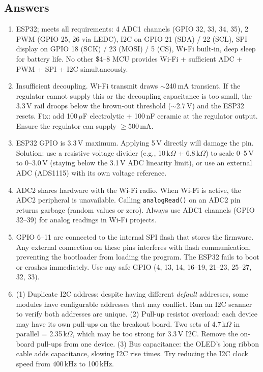 \documentclass[11pt,letterpaper,twoside,openany]{book}
\begin{document}
\subsection{Answers}
\begin{enumerate}[leftmargin=1.5em]
\item ESP32; meets all requirements: 4 ADC1 channels (GPIO 32, 33, 34, 35), 2 PWM (GPIO 25, 26 via LEDC), I2C on GPIO 21 (SDA) / 22 (SCL), SPI display on GPIO 18 (SCK) / 23 (MOSI) / 5 (CS), Wi-Fi built-in, deep sleep for battery life. No other \$4--8 MCU provides Wi-Fi + sufficient ADC + PWM + SPI + I2C simultaneously.
\item Insufficient decoupling. Wi-Fi transmit draws $\sim$240\,mA transient. If the regulator cannot supply this or the decoupling capacitance is too small, the 3.3\,V rail droops below the brown-out threshold ($\sim$2.7\,V) and the ESP32 resets. Fix: add 100\,$\mu$F electrolytic + 100\,nF ceramic at the regulator output. Ensure the regulator can supply $\geq$500\,mA.
\item ESP32 GPIO is 3.3\,V maximum. Applying 5\,V directly will damage the pin. Solution: use a resistive voltage divider (e.g., 10\,k$\Omega$ + 6.8\,k$\Omega$) to scale 0--5\,V to 0--3.0\,V (staying below the 3.1\,V ADC linearity limit), or use an external ADC (ADS1115) with its own voltage reference.
\item ADC2 shares hardware with the Wi-Fi radio. When Wi-Fi is active, the ADC2 peripheral is unavailable. Calling \texttt{analogRead()} on an ADC2 pin returns garbage (random values or zero). Always use ADC1 channels (GPIO 32--39) for analog readings in Wi-Fi projects.
\item GPIO 6--11 are connected to the internal SPI flash that stores the firmware. Any external connection on these pins interferes with flash communication, preventing the bootloader from loading the program. The ESP32 fails to boot or crashes immediately. Use any safe GPIO (4, 13, 14, 16--19, 21--23, 25--27, 32, 33).
\item (1) Duplicate I2C address: despite having different \emph{default} addresses, some modules have configurable addresses that may conflict. Run an I2C scanner to verify both addresses are unique. (2) Pull-up resistor overload: each device may have its own pull-ups on the breakout board. Two sets of 4.7\,k$\Omega$ in parallel = 2.35\,k$\Omega$, which may be too strong for 3.3\,V I2C. Remove the on-board pull-ups from one device. (3) Bus capacitance: the OLED's long ribbon cable adds capacitance, slowing I2C rise times. Try reducing the I2C clock speed from 400\,kHz to 100\,kHz.

\end{enumerate}
\end{document}
